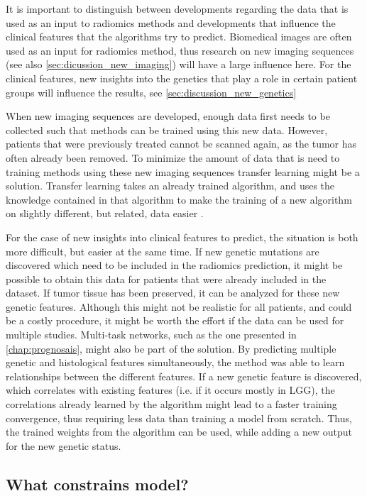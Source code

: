 It is important to distinguish between developments regarding the data that is used as an input to radiomics methods and developments that influence the clinical features that the algorithms try to predict.
Biomedical images are often used as an input for radiomics method, thus research on new imaging sequences (see also \cref{sec:dicussion_new_imaging}) will have a large influence here.
For the clinical features, new insights into the genetics that play a role in certain patient groups will influence the results, see \cref{sec:discussion_new_genetics}

When new imaging sequences are developed, enough data first needs to be collected such that methods can be trained using this new data.
However, patients that were previously treated cannot be scanned again, as the \gls{tumor} has often already been removed.
To minimize the amount of data that is need to training methods using these new imaging sequences transfer learning might be a solution.
Transfer learning takes an already trained algorithm, and uses the knowledge contained in that algorithm to make the training of a new algorithm on slightly different, but related, data easier \autocite{shin2016transfer}.

For the case of new insights into clinical features to predict, the situation is both more difficult, but easier at the same time.
If new genetic mutations are discovered which need to be included in the radiomics prediction, it might be possible to obtain this data for patients that were already included in the dataset.
If tumor tissue has been preserved, it can be analyzed for these new genetic features.
Although this might not be realistic for all patients, and could be a costly procedure, it might be worth the effort if the data can be used for multiple studies.
Multi-task networks, such as the one presented in \cref{chap:prognosais}, might also be part of the solution.
By predicting multiple genetic and histological features simultaneously, the method was able to learn relationships between the different features.
If a new genetic feature is discovered, which correlates with existing features (i.e. if it occurs mostly in \gls{LGG}), the correlations already learned by the algorithm might lead to a faster training convergence, thus requiring less data than training a model from scratch.
Thus, the trained weights from the algorithm can be used, while adding a new output for the new genetic status.


\subsection{What constrains model?}

